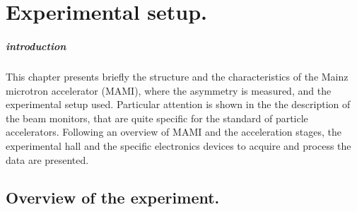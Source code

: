 \chapter{Experimental setup.} 

\paragraph{introduction} This chapter presents briefly the structure and the characteristics of the Mainz microtron accelerator (MAMI), where the \transv asymmetry is measured, and the experimental setup used. Particular attention is shown in the the description of the beam monitors, that are quite specific for the standard of particle accelerators. Following an overview of MAMI and the acceleration stages, the experimental hall and the specific electronics devices to acquire and process the data are presented. 

\section{Overview of the experiment.} \label{FirstDescription}

